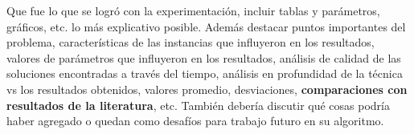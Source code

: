Que fue lo que se logró con la experimentación, incluir tablas y parámetros,
gráficos, etc. lo más explicativo posible. Además destacar puntos
importantes del problema, características de las instancias que influyeron
en los resultados, valores de parámetros que influyeron en los resultados,
análisis de calidad de las soluciones encontradas a través del tiempo,
análisis en profundidad de la técnica vs los resultados obtenidos,
valores promedio, desviaciones, \textbf{comparaciones con resultados
de la literatura}, etc. También debería discutir qué cosas podría
haber agregado o quedan como desafíos para trabajo futuro en su algoritmo.